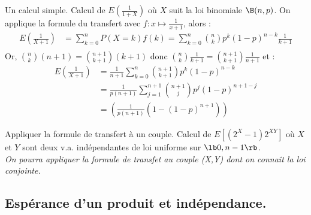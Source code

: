\documentclass[11pt]{article}
\begin{document}
\begin{ex}{Un calcul simple.}{}
    Calcul de $E\left( \frac{1}{1+X} \right)$ où $X$ suit la loi binomiale $\B(n,p)$.
    \tcblower
    On applique la formule du transfert avec $f:x\mapsto\frac{1}{x+1}$, alors :
    \begin{align*}
        E\left( \frac{1}{X+1} \right) &= \sum_{k=0}^nP(X=k)f(k)=\sum_{k=0}^n\binom{n}{k}p^k(1-p)^{n-k}\frac{1}{k+1}\\
    \end{align*}
    Or, $\binom{n}{k}(n+1)=\binom{n+1}{k+1}(k+1)$ donc $\binom{n}{k}\frac{1}{k+1}=\binom{n+1}{k+1}\frac{1}{n+1}$ et :
    \begin{align*}
        E\left( \frac{1}{X+1} \right) &= \frac{1}{n+1}\sum_{k=0}^n \binom{n+1}{k+1}p^k(1-p)^{n-k}\\
        &= \frac{1}{p(n+1)}\sum_{j=1}^{n+1}\binom{n+1}{j}p^{j}(1-p)^{n+1-j}\\
        &= \left( \frac{1}{p(n+1)}\left( 1 - (1-p)^{n+1} \right) \right)
    \end{align*}
\end{ex}

\begin{ex}{Appliquer la formule de transfert à un couple.}{}
    Calcul de $E[(2^X-1)2^{XY}]$ où $X$ et $Y$ sont deux v.a. indépendantes de loi uniforme sur $\lb0,n-1\rb$.\\
    \emph{On pourra appliquer la formule de transfet au couple (X,Y) dont on connaît la loi conjointe.}
\end{ex}

\pagebreak

\subsection{Espérance d'un produit et indépendance.}
\end{document}

